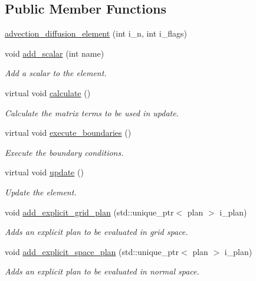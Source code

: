 \subsection*{Public Member Functions}
\begin{DoxyCompactItemize}
\item 
\hyperlink{classone__d_1_1advection__diffusion__element_a16b48aeb792f7cc2e88b15e0c6084eb0}{advection\-\_\-diffusion\-\_\-element} (int i\-\_\-n, int i\-\_\-flags)
\item 
void \hyperlink{classone__d_1_1element_af02a8e438b872fbf87893a41bee23098}{add\-\_\-scalar} (int name)
\begin{DoxyCompactList}\small\item\em Add a scalar to the element. \end{DoxyCompactList}\item 
virtual void \hyperlink{classbases_1_1element_a11b38922e9235387cc7454cdbf574083}{calculate} ()
\begin{DoxyCompactList}\small\item\em Calculate the matrix terms to be used in update. \end{DoxyCompactList}\item 
virtual void \hyperlink{classbases_1_1element_a326fa42addabf81c0f283b41050c0a88}{execute\-\_\-boundaries} ()
\begin{DoxyCompactList}\small\item\em Execute the boundary conditions. \end{DoxyCompactList}\item 
virtual void \hyperlink{classbases_1_1element_a5a28329097f10e5969d9fc1df8c4f3c0}{update} ()
\begin{DoxyCompactList}\small\item\em Update the element. \end{DoxyCompactList}\item 
void \hyperlink{classbases_1_1element_ae06b8652e590e92cd4e00b25cdc6e093}{add\-\_\-explicit\-\_\-grid\-\_\-plan} (std\-::unique\-\_\-ptr$<$ plan $>$ i\-\_\-plan)
\begin{DoxyCompactList}\small\item\em Adds an explicit plan to be evaluated in grid space. \end{DoxyCompactList}\item 
void \hyperlink{classbases_1_1element_af88394210714fd50d3559dc7b243725d}{add\-\_\-explicit\-\_\-space\-\_\-plan} (std\-::unique\-\_\-ptr$<$ plan $>$ i\-\_\-plan)
\begin{DoxyCompactList}\small\item\em Adds an explicit plan to be evaluated in normal space. \end{DoxyCompactList}\item 

\end{DoxyCompactItemize}
